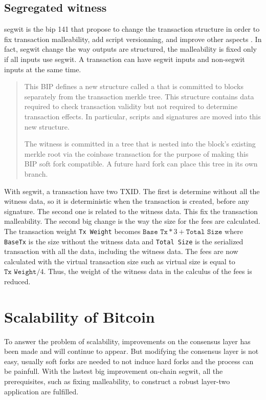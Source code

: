 \subsection{Segregated witness}

\gls{segwit} is the \gls{bip} 141 that propose to change the transaction structure
in order to fix transaction malleability, add script versionning, and improve other
aspects \cite{SegWit, SegWitBIP}. In fact, \gls{segwit} change the way outputs are
structured, the malleability is fixed only if all inputs use \gls{segwit}. A
transaction can have \gls{segwit} inputs and non-\gls{segwit} inputs at the same
time.

\begin{quote}
  This BIP defines a new structure called a  that is committed to
  blocks separately from the transaction merkle tree. This structure contains
  data required to check transaction validity but not required to determine
  transaction effects. In particular, scripts and signatures are moved into this
  new structure.

  The witness is committed in a tree that is nested into the block's existing
  merkle root via the coinbase transaction for the purpose of making this BIP
  soft fork compatible. A future hard fork can place this tree in its own branch.
\end{quote}

With \gls{segwit}, a transaction have two TXID. The first is determine without
all the witness data, so it is deterministic when the transaction is created,
before any signature. The second one is related to the witness data. This fix
the transaction malleability. The second big change is the way the size for the
fees are calculated. The transaction weight \texttt{Tx Weight} becomes
$\texttt{Base Tx} * 3 + \texttt{Total Size}$ where \texttt{BaseTx} is the size
without the witness data and \texttt{Total Size} is the serialized transaction
with all the data, including the witness data.
The fees are now calculated with the virtual transaction size such as virtual
size is equal to $\texttt{Tx Weight} / 4$. Thus, the weight of the witness data
in the calculus of the fees is reduced.

\section{Scalability of Bitcoin}

To answer the problem of scalability, improvements on the consensus layer has been
made and will continue to appear. But modifying the consensus layer is not easy,
usually soft forks are needed to not induce hard forks and the process can be
painfull. With the lastest big improvement on-chain \gls{segwit}, all the prerequisites,
such as fixing malleability, to construct a robust layer-two application are fulfilled.

